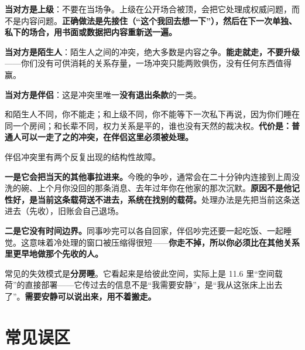 \textbf{当对方是上级}：不要在当场争。上级在公开场合被顶，会把它处理成权威问题，而不是内容问题。\textbf{正确做法是先接住（“这个我回去想一下”），然后在下一次单独、私下的场合，用书面或数据把内容重新送一遍。}

\textbf{当对方是陌生人}：陌生人之间的冲突，绝大多数是内容之争。\textbf{能走就走，不要升级}——你们没有可供消耗的关系存量，一场冲突只能两败俱伤，没有任何东西值得赢。

\textbf{当对方是伴侣}：这是冲突里唯一\textbf{没有退出条款}的一类。

和陌生人不同，你不能走；和上级不同，你不能等下一次私下再说，因为你们睡在同一个房间；和长辈不同，权力关系是平的，谁也没有天然的裁决权。\textbf{代价是：普通人可以一走了之的冲突，在伴侣这里必须被处理。}

伴侣冲突里有两个反复出现的结构性故障。

\textbf{一是它会把当天的其他事拉进来。}今晚的争吵，通常会在二十分钟内连接到上周没洗的碗、上个月你没回的那条消息、去年过年你在他家的那次沉默。\textbf{原因不是他记性好，是当前这条载荷送不进去，系统在找别的载荷。}处理办法是先把当前这条送进去（先收），旧账会自己退场。

\textbf{二是它没有时间边界。}同事吵完可以各自回家，伴侣吵完还要一起吃饭、一起睡觉。这意味着冷处理的窗口被压缩得很短——\textbf{你走不掉，所以你必须比在其他关系里更早地做那个先收的人。}

\begin{mdquote}
常见的失效模式是\textbf{分房睡}。它看起来是给彼此空间，实际上是 11.6 里“空间载荷”的直接部署——它传过去的信息不是“我需要安静”，是“我从这张床上出去了”。\textbf{需要安静可以说出来，用不着搬走。}
\end{mdquote}

\section[常见误区]{常见误区}




